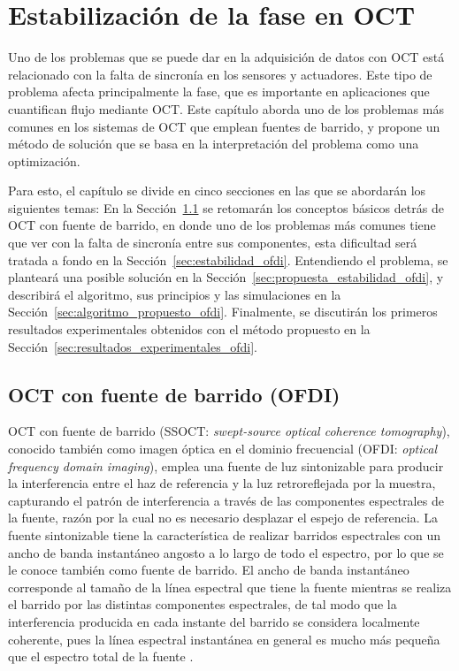 \chapter{Estabilización de la fase en OCT}
\label{chapter:estabilizacion_fase}

Uno de los problemas que se puede dar en la adquisición de datos con OCT está relacionado con la falta de sincronía en los sensores y actuadores. Este tipo de problema afecta principalmente la fase, que es importante en aplicaciones que cuantifican flujo mediante OCT. Este capítulo aborda uno de los problemas más comunes en los sistemas de OCT que emplean fuentes de barrido, y propone un método de solución que se basa en la interpretación del problema como una optimización. 

Para esto, el capítulo se divide en cinco secciones en las que se abordarán los siguientes temas: En la Sección~\ref{sec:ofdi} se retomarán los conceptos básicos detrás de OCT con fuente de barrido, en donde uno de los problemas más comunes tiene que ver con la falta de sincronía entre sus componentes, esta dificultad será tratada a fondo en la Sección~\ref{sec:estabilidad_ofdi}. Entendiendo el problema, se planteará una posible solución en la Sección~\ref{sec:propuesta_estabilidad_ofdi}, y describirá el algoritmo, sus principios y las simulaciones en la Sección~\ref{sec:algoritmo_propuesto_ofdi}. Finalmente, se discutirán los primeros resultados experimentales obtenidos con el método propuesto en la Sección~\ref{sec:resultados_experimentales_ofdi}.

\section{OCT con fuente de barrido (OFDI)}
\label{sec:ofdi}

OCT con fuente de barrido (SSOCT: \textit{swept-source optical coherence tomography}), conocido también como imagen óptica en el dominio frecuencial (OFDI: \textit{optical frequency domain imaging}), emplea una fuente de luz sintonizable para producir la interferencia entre el haz de referencia y la luz retroreflejada por la muestra, capturando el patrón de interferencia a través de las componentes espectrales de la fuente, razón por la cual no es necesario desplazar el espejo de referencia. La fuente sintonizable tiene la característica de realizar barridos espectrales con un ancho de banda instantáneo angosto a lo largo de todo el espectro, por lo que se le conoce también como fuente de barrido. El ancho de banda instantáneo corresponde al tamaño de la línea espectral que tiene la fuente mientras se realiza el barrido por las distintas componentes espectrales, de tal modo que la interferencia producida en cada instante del barrido se considera localmente coherente, pues la línea espectral instantánea en general es mucho más pequeña que el espectro total de la fuente \cite{Golubovic1997,Chinn1997,Drexler2015}.

